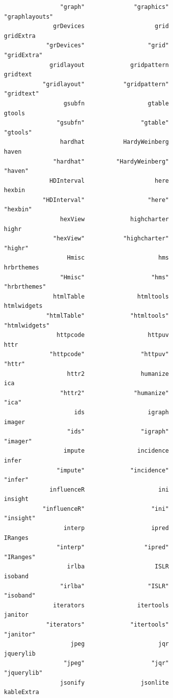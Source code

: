 \documentclass[
  letterpaper,
  DIV=11,
  numbers=noendperiod]{scrreprt}
\begin{document}
\begin{verbatim}
                "graph"              "graphics"          "graphlayouts" 
              grDevices                    grid               gridExtra 
            "grDevices"                  "grid"             "gridExtra" 
             gridlayout             gridpattern                gridtext 
           "gridlayout"           "gridpattern"              "gridtext" 
                 gsubfn                  gtable                  gtools 
               "gsubfn"                "gtable"                "gtools" 
                hardhat           HardyWeinberg                   haven 
              "hardhat"         "HardyWeinberg"                 "haven" 
             HDInterval                    here                  hexbin 
           "HDInterval"                  "here"                "hexbin" 
                hexView             highcharter                   highr 
              "hexView"           "highcharter"                 "highr" 
                  Hmisc                     hms              hrbrthemes 
                "Hmisc"                   "hms"            "hrbrthemes" 
              htmlTable               htmltools             htmlwidgets 
            "htmlTable"             "htmltools"           "htmlwidgets" 
               httpcode                  httpuv                    httr 
             "httpcode"                "httpuv"                  "httr" 
                  httr2                humanize                     ica 
                "httr2"              "humanize"                   "ica" 
                    ids                  igraph                  imager 
                  "ids"                "igraph"                "imager" 
                 impute               incidence                   infer 
               "impute"             "incidence"                 "infer" 
             influenceR                     ini                 insight 
           "influenceR"                   "ini"               "insight" 
                 interp                   ipred                 IRanges 
               "interp"                 "ipred"               "IRanges" 
                  irlba                    ISLR                 isoband 
                "irlba"                  "ISLR"               "isoband" 
              iterators               itertools                 janitor 
            "iterators"             "itertools"               "janitor" 
                   jpeg                     jqr               jquerylib 
                 "jpeg"                   "jqr"             "jquerylib" 
                jsonify                jsonlite              kableExtra 

\end{verbatim}
\end{document}

